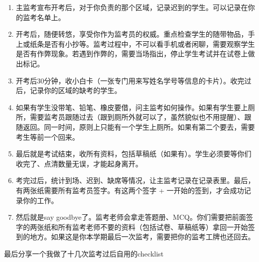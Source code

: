 \begin{enumerate}
    \item 主监考宣布开考后，对于你负责的那个区域，记录迟到的学生。可以记录在你的监考名单上。
    \item 开考后，随便转悠，享受你作为监考员的权威。重点检查学生的随带物品，手上或纸条是否有小抄等。监考过程中，不可以看手机或者闲聊，需要观察学生是否有作弊现象。若遇到作弊的，需要当场指出，停止学生考试并在试卷上做出标记。
    \item 开考后30分钟，收小白卡（一张专门用来写姓名学号等信息的卡片）。收完过后，记录你的区域的缺考的学生。
    \item 如果有学生没带笔、铅笔、橡皮要借，问主监考如何操作。如果有学生要上厕所，需要监考员跟随过去（跟到厕所外就可以了，虽然貌似也不用提醒）、跟随返回。同一时间，原则上只能有一个学生上厕所。如果有第二个要去，需要考生等前一个回来。
    \item 最后就是考试结束，收所有资料，包括草稿纸（如果有）。学生必须要等你们收完了、点清数量无误，才能起身离开。
    \item 考完过后，统计到场、迟到、缺席等情况，让主监考记录在记录表里。最后，有两张纸需要所有监考员签字。有这两个签字 + 一开始的签到，才会成功记录你的工作。
    \item 然后就是say goodbye了。监考老师会拿走答题册、MCQ。你们需要把前面签字的两张纸和所有监考老师不要的资料（包括试卷、草稿纸等）拿回一开始签到的地方。如果这是你本学期最后一次监考，需要把你的监考工牌也还回去。
\end{enumerate}

\emptyline{}
最后分享一个我做了十几次监考过后自用的checklist


